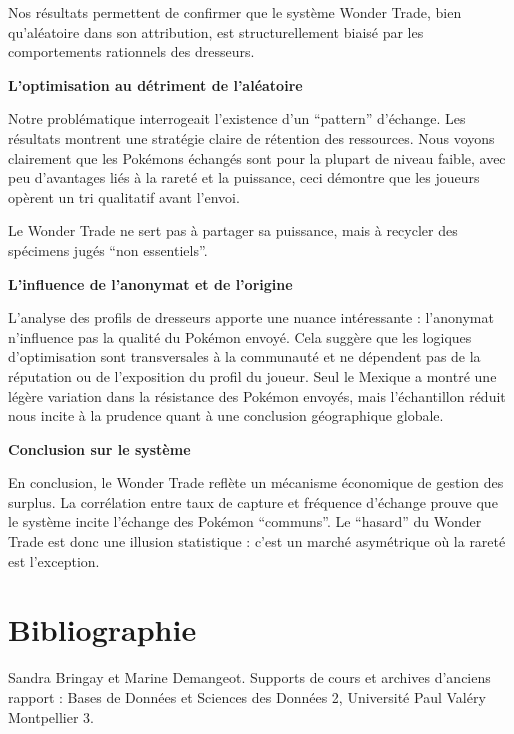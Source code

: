 \documentclass[mstat,12pt]{unswthesis}
\begin{document}
Nos résultats permettent de confirmer que le système Wonder Trade, bien
qu'aléatoire dans son attribution, est structurellement biaisé par les
comportements rationnels des dresseurs.

\bigskip

\textbf{L'optimisation au détriment de l'aléatoire}

\smallskip

Notre problématique interrogeait l'existence d'un ``pattern'' d'échange.
Les résultats montrent une stratégie claire de rétention des ressources.
Nous voyons clairement que les Pokémons échangés sont pour la plupart de
niveau faible, avec peu d'avantages liés à la rareté et la puissance,
ceci démontre que les joueurs opèrent un tri qualitatif avant l'envoi.

Le Wonder Trade ne sert pas à partager sa puissance, mais à recycler des
spécimens jugés ``non essentiels''.

\medskip

\textbf{L'influence de l'anonymat et de l'origine}

\smallskip

L'analyse des profils de dresseurs apporte une nuance intéressante :
l'anonymat n'influence pas la qualité du Pokémon envoyé. Cela suggère
que les logiques d'optimisation sont transversales à la communauté et ne
dépendent pas de la réputation ou de l'exposition du profil du joueur.
Seul le Mexique a montré une légère variation dans la résistance des
Pokémon envoyés, mais l'échantillon réduit nous incite à la prudence
quant à une conclusion géographique globale.

\medskip

\textbf{Conclusion sur le système}

\smallskip

En conclusion, le Wonder Trade reflète un mécanisme économique de
gestion des surplus. La corrélation entre taux de capture et fréquence
d'échange prouve que le système incite l'échange des Pokémon
``communs''. Le ``hasard'' du Wonder Trade est donc une illusion
statistique : c'est un marché asymétrique où la rareté est l'exception.

\chapter*{Bibliographie}\label{bibliographie}

Sandra Bringay et Marine Demangeot. Supports de cours et archives
d'anciens rapport : Bases de Données et Sciences des Données 2,
Université Paul Valéry Montpellier 3.
\end{document}
